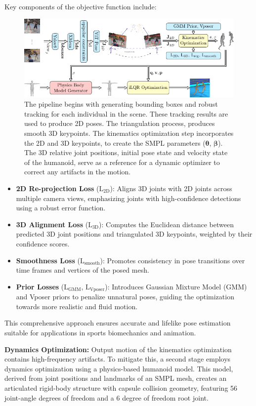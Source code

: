 \documentclass{egpubl}
\begin{document}
Key components of the objective function include:
\begin{figure}[htp]
\includegraphics[width=0.8\linewidth]{pipeline.pdf}
 \centering
  \caption{The pipeline begins with generating bounding boxes  and robust tracking  for each individual in the scene. These tracking results are used to produce 2D poses. The triangulation process, produces smooth 3D keypoints. The kinematics optimization step incorporates the 2D and 3D keypoints, to create the SMPL parameters ($\mathbf{\theta}$, $\mathbf{\beta}$). The 3D relative joint positions, initial pose state  and velocity state of the humanoid, serve as a reference for a dynamic optimizer to correct any artifacts in the motion.}
\end{figure}
\begin{itemize}
    \item \textbf{2D Re-projection Loss} ($\mathrm{L}_\text{2D}$): Aligns 3D joints with 2D joints across multiple camera views, emphasizing joints with high-confidence detections using a robust error function.
    \item \textbf{3D Alignment Loss} ($\mathrm{L}_\text{3D}$): Computes the Euclidean distance between predicted 3D joint positions and triangulated 3D keypoints, weighted by their confidence scores.
    \item \textbf{Smoothness Loss} ($\mathrm{L}_\text{smooth}$): Promotes consistency in pose transitions over time frames and vertices of the posed mesh.
    \item \textbf{Prior Losses} ($\mathrm{L}_{\text{GMM}}$, $\mathrm{L}_{\text{Vposer}}$): Introduces Gaussian Mixture Model (GMM) and Vposer priors to penalize unnatural poses, guiding the optimization towards more realistic and fluid motion.
\end{itemize}
 This comprehensive approach ensures accurate and lifelike pose estimation suitable for applications in sports biomechanics and animation.


\textbf{Dynamics Optimization:} Output motion of the kinematics optimization contains high-frequency artifacts. To mitigate this, a second stage employs dynamics optimization using a physics-based humanoid model. This model, derived from joint positions and landmarks of an SMPL mesh, creates an articulated rigid-body structure with capsule collision geometry, featuring 56 joint-angle degrees of freedom and a 6 degree of freedom root joint.
\end{document}
